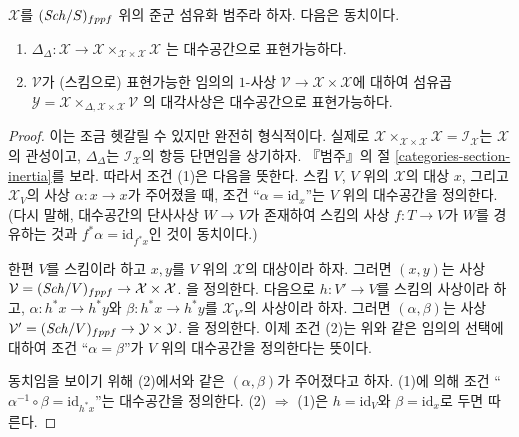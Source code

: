 \begin{lemma}
\label{lemma-second-diagonal}
$\mathcal{X}$를 $(\mathit{Sch}/S)_{fppf}$ 위의 준군 섬유화 범주라 하자.
다음은 동치이다.
\begin{enumerate}
\item $\Delta_\Delta : \mathcal{X} \to
\mathcal{X} \times_{\mathcal{X} \times \mathcal{X}} \mathcal{X}$
는 대수공간으로 표현가능하다.
\item $\mathcal{V}$가 (스킴으로) 표현가능한 임의의 $1$-사상
$\mathcal{V} \to \mathcal{X} \times \mathcal{X}$에 대하여 섬유곱
$\mathcal{Y} =
\mathcal{X} \times_{\Delta, \mathcal{X} \times \mathcal{X}} \mathcal{V}$
의 대각사상은 대수공간으로 표현가능하다.
\end{enumerate}
\end{lemma}

\begin{proof}
이는 조금 헷갈릴 수 있지만 완전히 형식적이다. 실제로
$\mathcal{X} \times_{\mathcal{X} \times \mathcal{X}} \mathcal{X} =
\mathcal{I}_\mathcal{X}$는 $\mathcal{X}$의 관성이고,
$\Delta_\Delta$는 $\mathcal{I}_\mathcal{X}$의 항등 단면임을 상기하자.
『범주』의 절 \ref{categories-section-inertia}를 보라.
따라서 조건 (1)은 다음을 뜻한다. 스킴 $V$, $V$ 위의
$\mathcal{X}$의 대상 $x$, 그리고 $\mathcal{X}_V$의 사상
$\alpha : x \to x$가 주어졌을 때, 조건
“$\alpha = \text{id}_x$”는 $V$ 위의 대수공간을 정의한다.
(다시 말해, 대수공간의 단사사상 $W \to V$가 존재하여 스킴의 사상
$f : T \to V$가 $W$를 경유하는 것과
$f^*\alpha = \text{id}_{f^*x}$인 것이 동치이다.)

\medskip\noindent
한편 $V$를 스킴이라 하고 $x, y$를 $V$ 위의 $\mathcal{X}$의 대상이라 하자.
그러면 $(x, y)$는 사상
$\mathcal{V} = (\mathit{Sch}/V)_{fppf} \to \mathcal{X} \times \mathcal{X}$.
을 정의한다. 다음으로 $h : V' \to V$를 스킴의 사상이라 하고,
$\alpha : h^*x \to h^*y$와 $\beta : h^*x \to h^*y$를
$\mathcal{X}_{V'}$의 사상이라 하자. 그러면 $(\alpha, \beta)$는 사상
$\mathcal{V}' = (\mathit{Sch}/V)_{fppf} \to \mathcal{Y} \times \mathcal{Y}$.
을 정의한다. 이제 조건 (2)는 위와 같은 임의의 선택에 대하여 조건
“$\alpha = \beta$”가 $V$ 위의 대수공간을 정의한다는 뜻이다.

\medskip\noindent
동치임을 보이기 위해 (2)에서와 같은 $(\alpha, \beta)$가 주어졌다고 하자.
(1)에 의해 조건
“$\alpha^{-1} \circ \beta = \text{id}_{h^*x}$”는 대수공간을 정의한다.
(2) $\Rightarrow$ (1)은 $h = \text{id}_V$와
$\beta = \text{id}_x$로 두면 따른다.
\end{proof}











